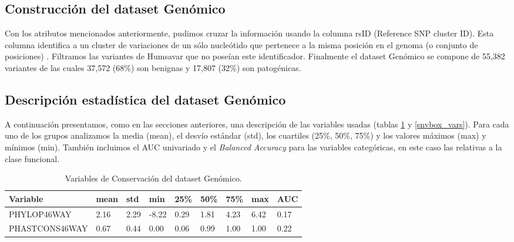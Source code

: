 
\subsection{Construcción del dataset Genómico}

Con los atributos mencionados anteriormente, pudimos cruzar la información usando la columna rsID (Reference SNP cluster ID). Esta columna identifica a un cluster de variaciones de un sólo nucleótido que pertenece a la misma posición en el genoma (o conjunto de posiciones) \cite{Ostell2007}. Filtramos las variantes de Humsavar que no poseían este identificador. Finalmente el dataset Genómico se compone de 55,382 variantes de las cuales 37,572 (68\%) son benignas y 17,807 (32\%) son patogénicas. 

\subsection{Descripción estadística del dataset Genómico}

A continuación presentamos, como en las secciones anteriores, una descripción de las variables usadas (tablas \ref{conservacion_vars} y \ref{snvbox_vars}). Para cada uno de los grupos analizamos la media (mean), el desvío estándar (std), los cuartiles (25\%, 50\%, 75\%) y los valores máximos (max) y mínimos (min). También incluimos el AUC univariado y el \textit{Balanced Accuracy} para las variables categóricas, en este caso las relativas a la clase funcional.

\begin{table}[H]
\centering
\begin{tabular}{|l|l|l|l|l|l|l|l|l|}
\hline
Variable & mean & std & min & 25\%  & 50\% & 75\%  & max & AUC \\ \hline
PHYLOP46WAY & 2.16 &  2.29 & -8.22 &  0.29 &  1.81 &  4.23 &  6.42 & 0.17 \\ \hline
PHASTCONS46WAY & 0.67 & 0.44 &  0.00 &  0.06 &  0.99 &  1.00 &  1.00 & 0.22 \\ \hline
\end{tabular}
\caption{Variables de Conservación del dataset Genómico.}
\label{conservacion_vars}
\end{table}

